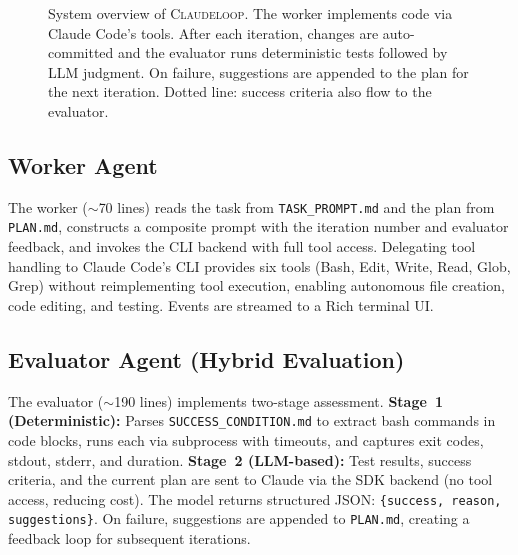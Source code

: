 \documentclass{article}
\begin{document}
\begin{figure}[t]
\caption{System overview of \textsc{Claudeloop}. The worker implements code via Claude Code's tools. After each iteration, changes are auto-committed and the evaluator runs deterministic tests followed by LLM judgment. On failure, suggestions are appended to the plan for the next iteration. Dotted line: success criteria also flow to the evaluator.}
\label{fig:system}
\end{figure}

\subsection{Worker Agent}

The worker ($\sim$70 lines) reads the task from \texttt{TASK\_PROMPT.md} and the plan from \texttt{PLAN.md}, constructs a composite prompt with the iteration number and evaluator feedback, and invokes the CLI backend with full tool access. Delegating tool handling to Claude Code's CLI provides six tools (Bash, Edit, Write, Read, Glob, Grep) without reimplementing tool execution, enabling autonomous file creation, code editing, and testing. Events are streamed to a Rich terminal UI.

\subsection{Evaluator Agent (Hybrid Evaluation)}

The evaluator ($\sim$190 lines) implements two-stage assessment. \textbf{Stage~1 (Deterministic):} Parses \texttt{SUCCESS\_CONDITION.md} to extract bash commands in code blocks, runs each via subprocess with timeouts, and captures exit codes, stdout, stderr, and duration. \textbf{Stage~2 (LLM-based):} Test results, success criteria, and the current plan are sent to Claude via the SDK backend (no tool access, reducing cost). The model returns structured JSON: \texttt{\{success, reason, suggestions\}}. On failure, suggestions are appended to \texttt{PLAN.md}, creating a feedback loop for subsequent iterations.
\end{document}

